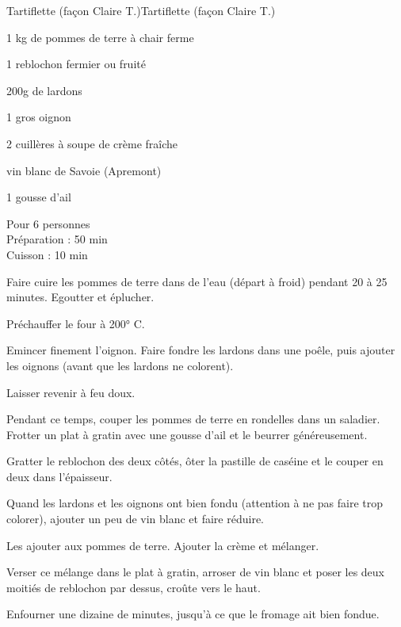 \begin{recette}{Tartiflette (façon Claire T.)}{Tartiflette (façon Claire T.)}

\begin{ingredients}
1 kg de pommes de terre à chair ferme\par
1 reblochon fermier ou fruité\par
200g de lardons\par
1 gros oignon\par
2 cuillères à soupe de crème fraîche\par
vin blanc de Savoie (Apremont)\par
1 gousse d'ail\par
\end{ingredients}

\begin{infos}
Pour 6 personnes\\
Préparation : 50 min\\
Cuisson : 10 min\\
\end{infos}

\begin{etapes}
\item Faire cuire les pommes de terre dans de l'eau (départ à froid) pendant 20 à 25 minutes. Egoutter et éplucher.
\item Préchauffer le four à 200° C.
\item Emincer finement l'oignon. Faire fondre les lardons dans une poêle, puis ajouter les oignons (avant que les lardons ne colorent).
\item Laisser revenir à feu doux.
\item Pendant ce temps, couper les pommes de terre en rondelles dans un saladier. Frotter un plat à gratin avec une gousse d'ail et le beurrer généreusement.
\item Gratter le reblochon des deux côtés, ôter la pastille de caséine et le couper en deux dans l'épaisseur.
\item Quand les lardons et les oignons ont bien fondu (attention à ne pas faire trop colorer), ajouter un peu de vin blanc et faire réduire.
\item Les ajouter aux pommes de terre. Ajouter la crème et mélanger.
\item Verser ce mélange dans le plat à gratin, arroser de vin blanc et poser les deux moitiés de reblochon par dessus, croûte vers le haut.
\item Enfourner une dizaine de minutes, jusqu'à ce que le fromage ait bien fondue.
\end{etapes}

\end{recette}